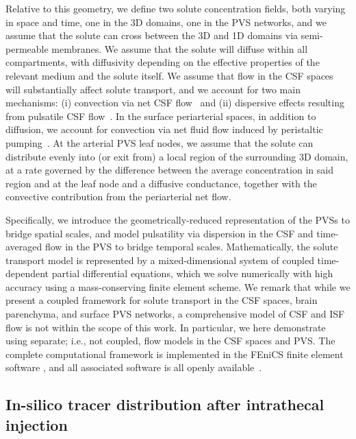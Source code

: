 \documentclass[fleqn,10pt]{wlscirep}
\begin{document}
Relative to this geometry, we define two
solute concentration fields, both varying in space and time, one in
the 3D domains, one in the PVS networks, and we assume that the solute
can cross between the 3D and 1D domains via semi-permeable
membranes. We assume that the solute will diffuse within all
compartments, with diffusivity depending on the effective properties
of the relevant medium and the solute
itself\cite{sykova2008diffusion}. We assume that flow in the CSF
spaces will substantially affect solute transport, and we account for
two main mechanisms: (i) convection via net CSF
flow~\cite{hornkjol2022csf} and (ii) dispersive effects resulting from
pulsatile CSF flow~\cite{sweetman2011cerebrospinal,
  vinje2019respiratory, ray2021quantitative}. In the surface
periarterial spaces, in addition to diffusion, we account for
convection via net fluid flow induced by peristaltic pumping~\cite{mestre2018flow, gjerde2023directional}. At the arterial PVS leaf nodes, we assume that the solute can distribute evenly into (or exit from) a local region of the surrounding 3D domain, at a rate governed by the difference between the average concentration in said region and at the leaf node and a diffusive conductance, together with the convective contribution from the periarterial net flow.

Specifically, we
introduce the geometrically-reduced representation of the PVSs to
bridge spatial scales, and model pulsatility via dispersion in the CSF
and time-averaged flow in the PVS to bridge temporal
scales. Mathematically, the solute transport model is represented by a
mixed-dimensional system of coupled time-dependent partial
differential equations\cite{masri2024modelling}, which we solve
numerically with high accuracy using a mass-conserving finite element
scheme. We remark that while we present a coupled framework for solute
transport in the CSF spaces, brain parenchyma, and surface PVS networks, a
comprehensive model of CSF and ISF flow is not within the scope of
this work. In particular, we here demonstrate using separate; i.e.,
not coupled, flow models in the CSF spaces and PVS. The complete
computational framework is implemented in the FEniCS finite element
software \cite{alnaes2015fenics, kuchta2020assembly}, and all
associated software is all openly available~\cite{ZENODO}.

\subsection*{In-silico tracer distribution after intrathecal injection}
\end{document}
